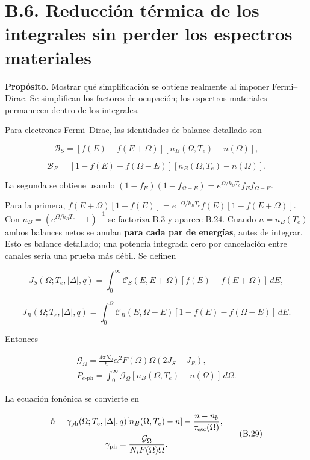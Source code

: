 \documentclass[
  spanish,
  10pt,
  a4paper,
]{article}
\begin{document}
\section{B.6. Reducción térmica de los integrales sin perder los
espectros
materiales}\label{b.6.-reducciuxf3n-tuxe9rmica-de-los-integrales-sin-perder-los-espectros-materiales}

\textbf{Propósito.} Mostrar qué simplificación se obtiene realmente al
imponer Fermi--Dirac. Se simplifican los factores de ocupación; los
espectros materiales permanecen dentro de los integrales.

Para electrones Fermi--Dirac, las identidades de balance detallado son

\[
\mathcal B_S=[f(E)-f(E+\Omega)]
[n_B(\Omega,T_e)-n(\Omega)], \tag{B.24}
\]

\[
\mathcal B_R=[1-f(E)-f(\Omega-E)]
[n_B(\Omega,T_e)-n(\Omega)]. \tag{B.25}
\]

La segunda se obtiene usando
\((1-f_E)(1-f_{\Omega-E})=e^{\Omega/k_BT_e}f_Ef_{\Omega-E}\).

Para la primera,
\(f(E+\Omega)[1-f(E)]=e^{-\Omega/k_BT_e}f(E)[1-f(E+\Omega)]\). Con
\(n_B=(e^{\Omega/k_BT_e}-1)^{-1}\) se factoriza B.3 y aparece B.24.
Cuando \(n=n_B(T_e)\) ambos balances netos se anulan \textbf{para cada
par de energías}, antes de integrar. Esto es balance detallado; una
potencia integrada cero por cancelación entre canales sería una prueba
más débil. Se definen

\[
J_S(\Omega;T_e,|\Delta|,q)=\int_0^\infty
\mathcal C_S(E,E+\Omega)[f(E)-f(E+\Omega)]\,dE, \tag{B.26}
\]

\[
J_R(\Omega;T_e,|\Delta|,q)=\int_0^\Omega
\mathcal C_R(E,\Omega-E)[1-f(E)-f(\Omega-E)]\,dE. \tag{B.27}
\]

Entonces

\[
\begin{gathered}
\mathcal G_\Omega=\frac{4\pi N_0}{\hbar}\alpha^2F(\Omega)\Omega(2J_S+J_R),\\
P_{e\text{-ph}}=\int_0^\infty\mathcal G_\Omega
[n_B(\Omega,T_e)-n(\Omega)]\,d\Omega.
\end{gathered} \tag{B.28}
\]

La ecuación fonónica se convierte en

\[
\begin{gathered}
\dot n=\gamma_{\rm ph}(\Omega;T_e,|\Delta|,q)
[n_B(\Omega,T_e)-n]-\frac{n-n_b}{\tau_{\rm esc}(\Omega)},\\
\gamma_{\rm ph}=\frac{\mathcal G_\Omega}{N_iF(\Omega)\Omega}.
\end{gathered} \tag{B.29}
\]
\end{document}
